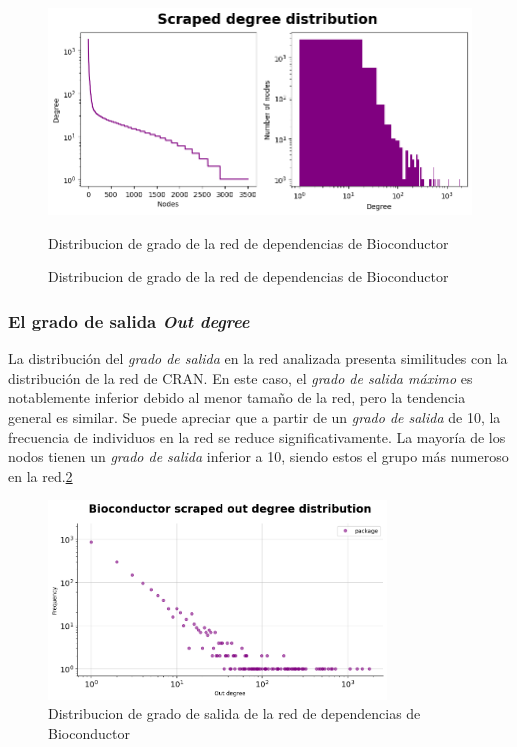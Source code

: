 \begin{figure}[ht!]
    \begin{center}
        \includegraphics[width=1\textwidth]{img/bioconductor/degree_dist.png}
        \caption{Distribucion de grado de la red de dependencias de Bioconductor}
        \label{fig:bioconductor_degree_dist}
        \caption{Distribucion de grado de la red de dependencias de Bioconductor}
    \end{center}
\end{figure}

\subsubsection{El grado de salida \textit{Out degree}}

La distribución del \emph{grado de salida} en la red analizada presenta similitudes con
la distribución de la red de CRAN. En este caso, el \emph{grado de salida máximo} es
notablemente inferior debido al menor tamaño de la red, pero la tendencia general es
similar. Se puede apreciar que a partir de un \emph{grado de salida} de 10, la frecuencia
de individuos en la red se reduce significativamente. La mayoría de los nodos tienen un
\emph{grado de salida} inferior a 10, siendo estos el grupo más numeroso en la red.\ref{fig:bioconductor_out_degree_dist}

\begin{figure}[ht!]
    \begin{center}
        \includegraphics[width=0.8\textwidth]{img/bioconductor/out_degree_dist.png}
        \caption{Distribucion de grado de salida de la red de dependencias de Bioconductor}
        \label{fig:bioconductor_out_degree_dist}
    \end{center}
\end{figure}

